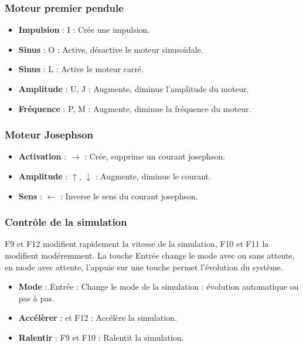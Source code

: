 \subsubsection{Moteur premier pendule}
%
\begin{itemize}[label=, leftmargin=2cm, itemsep=0pt]
\item {\bf Impulsion} : {\sf I} : Crée une impulsion.
\item {\bf Sinus} : {\sf O} : Active, désactive le moteur sinusoïdale.
\item {\bf Sinus} : {\sf L} : Active le moteur carré.
\item {\bf Amplitude} : {\sf U, J} :  Augmente, diminue l'amplitude du moteur.
\item {\bf Fréquence} : {\sf P, M} :  Augmente, diminue la fréquence du moteur.
\end{itemize}
%
%
\subsubsection{Moteur Josephson}
%
\begin{itemize}[label=, leftmargin=2cm, itemsep=0pt]
\item {\bf Activation} : $\rightarrow$ : Crée, supprime un courant josephson.
\item {\bf Amplitude} : $\mathtt{\uparrow}$, $\mathsf{\downarrow}$ : Augmente, diminue le courant.
\item {\bf Sens} : {\sf $\leftarrow$} : Inverse le sens du courant josephson.
\end{itemize}
%
%
\subsubsection{Contrôle de la simulation}
%
{\sf F9} et {\sf F12} modifient rapidement la vitesse de la simulation, {\sf F10} et {\sf F11} la modifient modéremment. La touche {\sf Entrée} change le mode avec ou sans attente, en mode avec attente, l'appuie sur une touche permet l'évolution du système.
%
\begin{itemize}[label=, leftmargin=2cm, itemsep=0pt]
\item {\bf Mode} : {\sf Entrée} : Change le mode de la simulation : évolution automatique ou pas à pas.
\item {\bf Accélèrer} : {} et {\sf F12} : Accélère la simulation.
\item {\bf Ralentir} : {\sf F9} et {\sf F10} : Ralentit la simulation.
\end{itemize}
%
%

